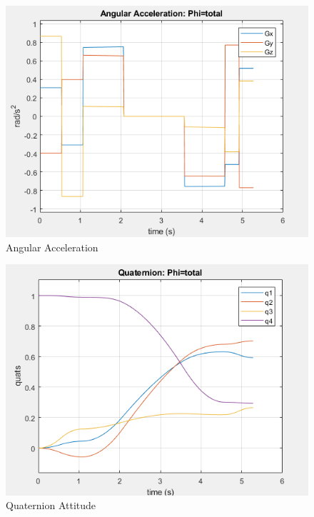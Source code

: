 \documentclass[letterpaper, preprint, paper,11pt]{AAS}	%
\begin{document}
		
			\begin{figure}[H]
				\label{fig:ang_accel_total}
				\begin{center}
					\includegraphics[width=4.5in]{figures/ang_accel_total.png}
				\end{center}
				\caption{Angular Acceleration}
			\end{figure}
		
			\begin{figure}[H]
				\label{fig:quats_phi_total}
				\begin{center}
				\includegraphics[width=4.5in]{figures/quats_phi_total.png}
				\end{center}
				\caption{Quaternion Attitude}
			\end{figure}
		
\end{document}
